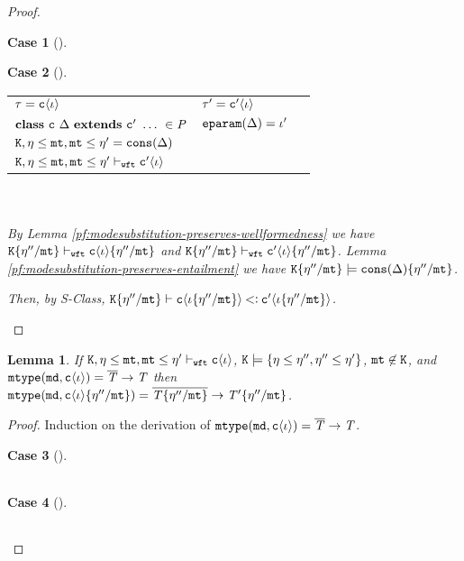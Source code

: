\documentclass[onecolumn,nocopyrightspace]{sigplanconf}
\newtheorem{lemma}{Lemma}
\theoremstyle{lessintrusive}
\theoremstyle{plain}
\theoremstyle{custom}
\newtheorem*{case}{Case}
\theoremstyle{subcase-custom}
\begin{document}
\begin{proof}
\begin{case}[]

\end{case}

\begin{case}[] 
\begin{tabular}[t]{>{$}l<{$} >{$}l<{$} >{$}l<{$}}
\t = \classiota & \t' = \Dname\lb\listi\rb & \\
\kwclass\ \Cname\ \tspec\ \kwextends\ \Dname\ \dots\ \in \programcode & \Feparam(\tspec) = \listi' & \\ 
\cset,\basemode\msub\mtvar,\mtvar\msub\basemode' = \Fcons(\tspec) & & \\
\cset,\basemode\msub\mtvar,\mtvar\msub\basemode'\judgewft\Dname\lb\listi\rb & & \\
\end{tabular}\\ \\
By Lemma \ref{pf:modesubstitution-preserves-wellformedness} we have $\cset\subst{\mtvar}{\basemode''} \judgewft\Cname\lb\listi\rb\subst{\mtvar}{\basemode''}$ and $\cset\subst{\mtvar}{\basemode''} \judgewft\Dname\lb\listi\rb\subst{\mtvar}{\basemode''}$. Lemma \ref{pf:modesubstitution-preserves-entailment} we have $\cset\subst{\mtvar}{\basemode''} \models \Fcons(\tspec)\subst{\mtvar}{\basemode''}$.

Then, by S-Class, $\mathtt{K}\{\eta''/\mathtt{mt}\}\vdash\mathtt{c}\langle\iota\{\eta''/\mathtt{mt}\}\rangle\mathbin{<\vcentcolon}\mathtt{c}'\langle\iota\{\eta''/\mathtt{mt}\}\rangle$. 

\end{case}

\end{proof}

\begin{lemma}
\label{pf:fmtype-substitutes}
If $\mathtt{K},\eta\leq\mathtt{mt},\mathtt{mt}\leq\eta'\vdash_{\tt wft}\mathtt{c}\langle\iota\rangle$, $\mathtt{K}\models\{\eta\leq\eta'',\eta''\leq\eta'\}$, $\mathtt{mt} \not\in \mathtt{K}$, and $\mathtt{mtype}(\mathtt{md},\mathtt{c}\langle\iota\rangle) = \overline{\mathit{T}}\rightarrow\mathit{T}$ then $\mathtt{mtype}(\mathtt{md},\mathtt{c}\langle\iota\rangle\{\eta''/\mathtt{mt}\}) = \overline{\mathit{T}\{\eta''/\mathtt{mt}\}}\rightarrow\mathit{T}'\{\eta''/\mathtt{mt}\}$. 
\end{lemma} 

\begin{proof}
Induction on the derivation of $\mathtt{mtype}(\mathtt{md},\mathtt{c}\langle\iota\rangle) = \overline{\mathit{T}}\rightarrow\mathit{T}$.

\begin{case}[] 
\begin{tabular}[t]{>{$}l<{$} >{$}l<{$} >{$}l<{$}}
\end{tabular}
\end{case}

\begin{case}[] 
\begin{tabular}[t]{>{$}l<{$} >{$}l<{$} >{$}l<{$}}
\end{tabular}
\end{case}

\end{proof}
\end{document}
